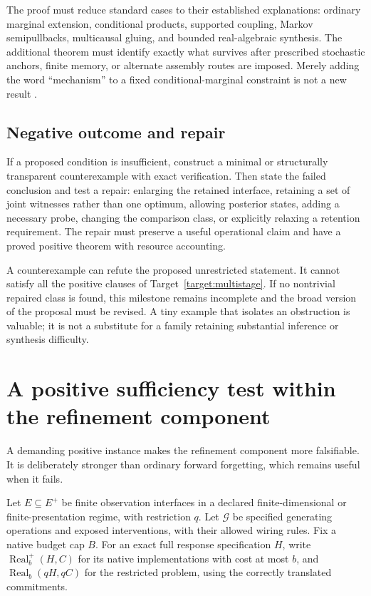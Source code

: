 \documentclass[11pt]{article}
\theoremstyle{remark}
\newcommand{\Real}{\operatorname{Real}}
\begin{document}
The proof must reduce standard cases to their established explanations: ordinary marginal extension, conditional products, supported coupling, Markov semipullbacks, multicausal gluing, and bounded real-algebraic synthesis. The additional theorem must identify exactly what survives after prescribed stochastic anchors, finite memory, or alternate assembly routes are imposed. Merely adding the word ``mechanism'' to a fixed conditional-marginal constraint is not a new result \cite{Joint,Refinement,Multicausal}.

\subsection{Negative outcome and repair}

If a proposed condition is insufficient, construct a minimal or structurally transparent counterexample with exact verification. Then state the failed conclusion and test a repair: enlarging the retained interface, retaining a set of joint witnesses rather than one optimum, allowing posterior states, adding a necessary probe, changing the comparison class, or explicitly relaxing a retention requirement. The repair must preserve a useful operational claim and have a proved positive theorem with resource accounting.

A counterexample can refute the proposed unrestricted statement. It cannot satisfy all the positive clauses of Target~\ref{target:multistage}. If no nontrivial repaired class is found, this milestone remains incomplete and the broad version of the proposal must be revised. A tiny example that isolates an obstruction is valuable; it is not a substitute for a family retaining substantial inference or synthesis difficulty.

\section{A positive sufficiency test within the refinement component}
\label{sec:finite-sufficiency}

A demanding positive instance makes the refinement component more falsifiable. It is deliberately stronger than ordinary forward forgetting, which remains useful when it fails.

Let $E\subseteq E^+$ be finite observation interfaces in a declared finite-dimensional or finite-presentation regime, with restriction $q$. Let $\mathcal G$ be specified generating operations and exposed interventions, with their allowed wiring rules. Fix a native budget cap $B$. For an exact full response specification $H$, write $\Real^+_b(H,C)$ for its native implementations with cost at most $b$, and $\Real_b(qH,qC)$ for the restricted problem, using the correctly translated commitments.
\end{document}
